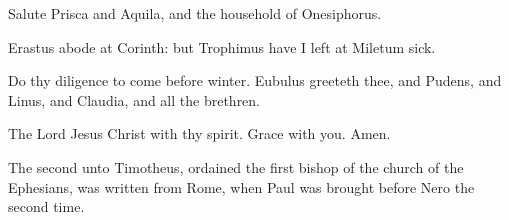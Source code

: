 {\par }{\PP {}Salute
Prisca
and
Aquila,
and the
household of
Onesiphorus.

Erastus
abode
at
Corinth:
but
Trophimus have I
left
at
Miletum
sick.

Do thy
diligence to
come
before
winter.
Eubulus
greeteth
thee,
and
Pudens,
and
Linus,
and
Claudia,
and
all the
brethren.

The
Lord
Jesus
Christ
{}
with
thy
spirit.
Grace
{}
with
you.
Amen.


\par }{\SH The second
{} unto Timotheus, ordained the first bishop of the church of the Ephesians, was written from Rome, when Paul was brought before Nero the second time.
\par }
